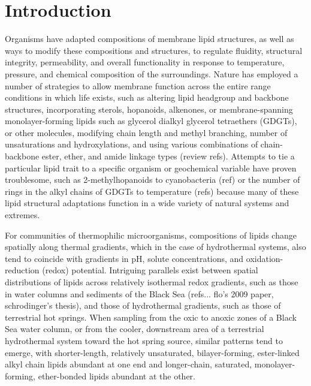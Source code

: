 \section{Introduction}
Organisms have adapted compositions of membrane lipid structures, as well as ways to modify these compositions and structures, to regulate fluidity, structural integrity, permeability, and overall functionality in response to temperature, pressure, and chemical composition of the surroundings. Nature has employed a number of strategies to allow membrane function across the entire range conditions in which life exists, such as altering lipid headgroup and backbone structures, incorporating sterols, hopanoids, alkenones, or membrane-spanning monolayer-forming lipids such as glycerol dialkyl glycerol tetraethers (GDGTs), or other molecules, modifying chain length and methyl branching, number of unsaturations and hydroxylations, and using various combinations of chain-backbone ester, ether, and amide linkage types (review refs). Attempts to tie a particular lipid trait to a specific organism or geochemical variable have proven troublesome, such as 2-methylhopanoids to cyanobacteria (ref) or the number of rings in the alkyl chains of GDGTs to temperature (refs) because many of these lipid structural adaptations function in a wide variety of natural systems and extremes.

For communities of thermophilic microorganisms, compositions of lipids change spatially along thermal gradients, which in the case of hydrothermal systems, also tend to coincide with gradients in pH, solute concentrations, and oxidation-reduction (redox) potential. Intriguing parallels exist between spatial distributions of lipids across relatively isothermal redox gradients, such as those in water columns and sediments of the Black Sea (refs... flo's 2009 paper, schrodinger's thesis), and those of hydrothermal gradients, such as those of terrestrial hot springs. When sampling from the oxic to anoxic zones of a Black Sea water column, or from the cooler, downstream area of a terrestrial hydrothermal system toward the hot spring source, similar patterns tend to emerge, with shorter-length, relatively unsaturated, bilayer-forming, ester-linked alkyl chain lipids abundant at one end and longer-chain, saturated, monolayer-forming, ether-bonded lipids abundant at the other.

